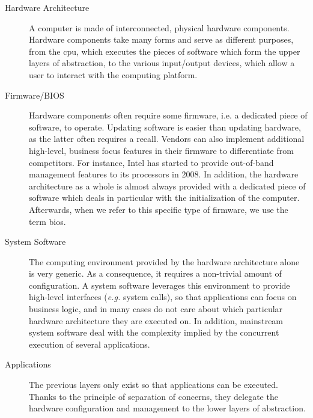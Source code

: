 \begin{description}
\item [Hardware Architecture]
  A computer is made of interconnected, physical hardware components.
  Hardware components take many forms and serve as different purposes, from the
  \ac{cpu}, which executes the pieces of software which form the upper layers of
  abstraction, to the various input/output devices, which allow a user to
  interact with the computing platform.
\item [Firmware/BIOS]
  Hardware components often require some firmware, i.e. a dedicated piece of software, to operate.
  Updating software is easier than updating hardware, as
  the latter often requires a recall.
  Vendors can also implement additional high-level, business focus features in their firmware to differentiate from competitors.
  For instance, Intel has started to provide out-of-band management features to
  its processors in 2008. 
  In addition, the hardware architecture as a whole is almost always provided
  with a dedicated piece of software which deals in particular with the
  initialization of the computer. 
  Afterwards, when we refer to this specific type of firmware, we use the term
  \ac{bios}. 
\item [System Software]
  The computing environment provided by the hardware architecture alone is very
  generic.
  As a consequence, it requires a non-trivial amount of configuration.
  A system software leverages this environment to provide high-level interfaces
  (\emph{e.g.} system calls), so that applications can focus on business logic,
  and in many cases do not care about which particular hardware architecture
  they are executed on.
  In addition, mainstream system software deal with the complexity implied by
  the concurrent execution of several applications.
\item [Applications]
  The previous layers only exist so that applications can be executed.
  Thanks to the principle of separation of concerns, they delegate the hardware
  configuration and management to the lower layers of abstraction.
\end{description}

